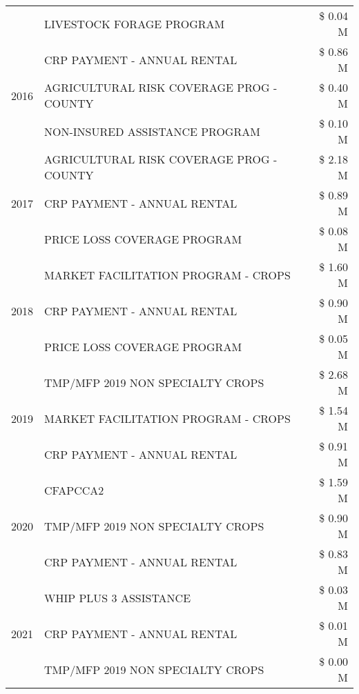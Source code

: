 \begin{tabular}{llr}
 & LIVESTOCK FORAGE PROGRAM & \$ 0.04 M \\
\cline{1-3}
\multirow[t]{3}{*}{2016} & CRP PAYMENT - ANNUAL RENTAL                   & \$ 0.86 M \\
 & AGRICULTURAL RISK COVERAGE PROG - COUNTY      & \$ 0.40 M \\
 & NON-INSURED ASSISTANCE PROGRAM                & \$ 0.10 M \\
\cline{1-3}
\multirow[t]{3}{*}{2017} & AGRICULTURAL RISK COVERAGE PROG - COUNTY & \$ 2.18 M \\
 & CRP PAYMENT - ANNUAL RENTAL & \$ 0.89 M \\
 & PRICE LOSS COVERAGE PROGRAM & \$ 0.08 M \\
\cline{1-3}
\multirow[t]{3}{*}{2018} & MARKET FACILITATION PROGRAM - CROPS & \$ 1.60 M \\
 & CRP PAYMENT - ANNUAL RENTAL & \$ 0.90 M \\
 & PRICE LOSS COVERAGE PROGRAM & \$ 0.05 M \\
\cline{1-3}
\multirow[t]{3}{*}{2019} & TMP/MFP 2019 NON SPECIALTY CROPS & \$ 2.68 M \\
 & MARKET FACILITATION PROGRAM - CROPS & \$ 1.54 M \\
 & CRP PAYMENT - ANNUAL RENTAL & \$ 0.91 M \\
\cline{1-3}
\multirow[t]{3}{*}{2020} & CFAPCCA2 & \$ 1.59 M \\
 & TMP/MFP 2019 NON SPECIALTY CROPS & \$ 0.90 M \\
 & CRP PAYMENT - ANNUAL RENTAL & \$ 0.83 M \\
\cline{1-3}
\multirow[t]{3}{*}{2021} & WHIP PLUS 3 ASSISTANCE & \$ 0.03 M \\
 & CRP PAYMENT - ANNUAL RENTAL & \$ 0.01 M \\
 & TMP/MFP 2019 NON SPECIALTY CROPS & \$ 0.00 M \\
\cline{1-3}
\bottomrule
\end{tabular}
